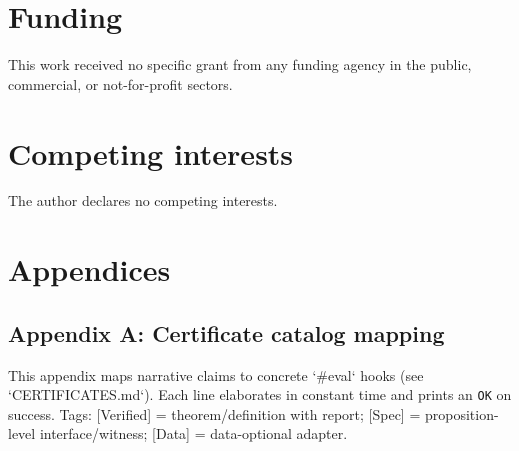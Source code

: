 \documentclass[11pt,a4paper,twoside]{article}
\numberwithin{equation}{section}
\theoremstyle{customthm}
\theoremstyle{customdef}
\theoremstyle{customrem}
\begin{document}
\section*{Funding}\label{sec:funding}
This work received no specific grant from any funding agency in the public, commercial, or not-for-profit sectors.

\section*{Competing interests}\label{sec:competing-interests}
The author declares no competing interests.

\section*{Appendices}

\subsection*{Appendix A: Certificate catalog mapping}\label{app:cert-catalog}
This appendix maps narrative claims to concrete `#eval` hooks (see `CERTIFICATES.md`). Each line elaborates in constant time and prints an \texttt{OK} on success. Tags: [Verified] = theorem/definition with report; [Spec] = proposition-level interface/witness; [Data] = data-optional adapter.
\end{document}
